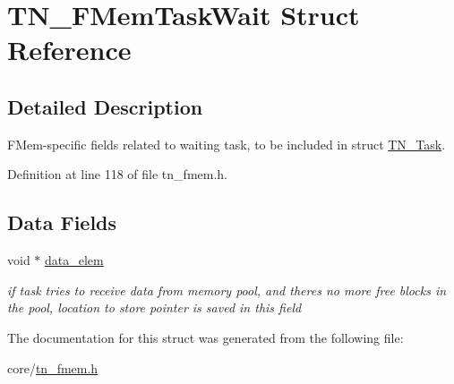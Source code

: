 \hypertarget{structTN__FMemTaskWait}{}\section{T\+N\+\_\+\+F\+Mem\+Task\+Wait Struct Reference}
\label{structTN__FMemTaskWait}


\subsection{Detailed Description}
F\+Mem-\/specific fields related to waiting task, to be included in struct \hyperlink{structTN__Task}{T\+N\+\_\+\+Task}. 

Definition at line 118 of file tn\+\_\+fmem.\+h.

\subsection*{Data Fields}
\begin{DoxyCompactItemize}
\item 
\mbox{\label{structTN__FMemTaskWait_a68632560b260859d863fbd3fc24b0506}} 
void $\ast$ \hyperlink{structTN__FMemTaskWait_a68632560b260859d863fbd3fc24b0506}{data\+\_\+elem}
\begin{DoxyCompactList}\small\item\em if task tries to receive data from memory pool, and there\textquotesingle{}s no more free blocks in the pool, location to store pointer is saved in this field \end{DoxyCompactList}\end{DoxyCompactItemize}


The documentation for this struct was generated from the following file\+:\begin{DoxyCompactItemize}
\item 
core/\hyperlink{tn__fmem_8h}{tn\+\_\+fmem.\+h}\end{DoxyCompactItemize}
